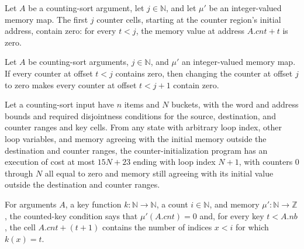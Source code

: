 \begin{definition}
\label{Light.CsZeroed}
\leanok
{}
Let $A$ be a counting-sort argument, let $j\in\mathbb{N}$, and let $\mu'$ be an
integer-valued memory map. The first $j$ counter cells, starting at the counter region's
initial address, contain zero: for every $t<j$, the memory value at address $A.cnt+t$ is
zero.
\end{definition}

\begin{theorem}
\label{Light.CsZeroed.succ}
\leanok
{}
Let $A$ be counting-sort arguments, $j\in\mathbb{N}$, and $\mu'$ an integer-valued
memory map. If every counter at offset $t<j$ contains zero, then changing the counter at
offset $j$ to zero makes every counter at offset $t<j+1$ contain zero.
\end{theorem}

\begin{theorem}
\label{Light.csZero_ends}
\leanok
{}
Let a counting-sort input have $n$ items and $N$ buckets, with the word and address
bounds and required disjointness conditions for the source, destination, and counter
ranges and key cells. From any state with arbitrary loop index, other loop variables,
and memory agreeing with the initial memory outside the destination and counter ranges,
the counter-initialization program has an execution of cost at most $15N+23$ ending with
loop index $N+1$, with counters $0$ through $N$ all equal to zero and memory still
agreeing with its initial value outside the destination and counter ranges.
\end{theorem}

\begin{definition}
\label{Light.CsCounted}
\leanok
{}
For arguments $A$, a key function $k:\mathbb{N}\to\mathbb{N}$, a count $i\in\mathbb{N}$, and
memory $\mu\prime:\mathbb{N}\to\mathbb{Z}$, the counted-key condition says that
$\mu\prime(A.cnt)=0$ and, for every key $t<A.nb$, the cell $A.cnt+(t+1)$ contains
the number of indices $x<i$ for which $k(x)=t$.
\end{definition}

